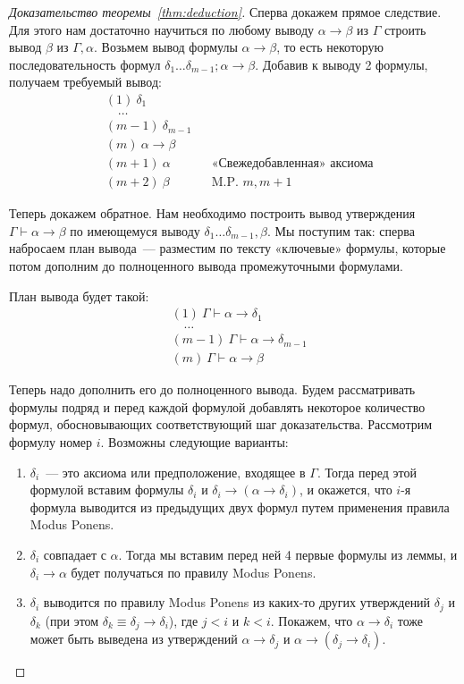 \documentclass[a4paper,11pt]{article}
\theoremstyle{definition}
\newcommand{\proves}{\vdash}
\begin{document}
\begin{proof}[Доказательство теоремы~\ref{thm:deduction}]
Сперва докажем прямое следствие. Для этого нам достаточно научиться по любому
выводу $\alpha \to \beta$ из $\Gamma$ строить вывод $\beta$ из $\Gamma, \alpha$.
Возьмем вывод формулы $\alpha \to \beta$, то есть некоторую последовательность
формул $\delta_1 \dots \delta_{m-1}; \alpha \to \beta$. Добавив к выводу 2
формулы, получаем требуемый вывод:
\begin{align*}
&(1)\ \delta_1\\
&\quad\dots\\
&(m-1)\ \delta_{m-1}\\
&(m)\ \alpha \to \beta\\
&(m+1)\ \alpha &&\text{«Свежедобавленная» аксиома}\\
&(m+2)\ \beta &&\text{M.P. } m, m+1
\end{align*}

Теперь докажем обратное. Нам необходимо построить вывод утверждения
$\Gamma \proves \alpha \to \beta$ по имеющемуся выводу
$\delta_1 \dots \delta_{m-1}, \beta$. Мы поступим так: сперва набросаем план
вывода~--- разместим по тексту «ключевые» формулы, которые потом дополним до
полноценного вывода промежуточными формулами.

План вывода будет такой:
\begin{align*}
&(1)\ \Gamma \proves \alpha \to \delta_1\\
&\quad\dots\\
&(m-1)\ \Gamma \proves \alpha \to \delta_{m-1}\\
&(m)\ \Gamma \proves \alpha \to \beta
\end{align*}

Теперь надо дополнить его до полноценного вывода. Будем рассматривать формулы
подряд и перед каждой формулой добавлять некоторое количество формул,
обосновывающих соответствующий шаг доказательства. Рассмотрим формулу номер $i$.
Возможны следующие варианты:
\begin{enumerate}
\item $\delta_i$~--- это аксиома или предположение, входящее в $\Gamma$. Тогда
  перед этой формулой вставим формулы $\delta_i$ и
  $\delta_i \to (\alpha \to \delta_i)$, и окажется, что $i$-я формула выводится
  из предыдущих двух формул путем применения правила Modus Ponens.
\item $\delta_i$ совпадает с $\alpha$. Тогда мы вставим перед ней 4 первые
  формулы из леммы, и $\delta_i \to \alpha$ будет получаться по правилу Modus
  Ponens.
\item $\delta_i$ выводится по правилу Modus Ponens из каких-то других
  утверждений $\delta_j$ и $\delta_k$ (при этом $\delta_k \equiv \delta_j \to
  \delta_i$), где $j < i$ и $k < i$. Покажем, что $\alpha \to \delta_i$ тоже
  может быть выведена из утверждений $\alpha \to \delta_j$ и $\alpha \to
  (\delta_j \to \delta_i)$.


\end{enumerate}
\end{proof}
\end{document}
